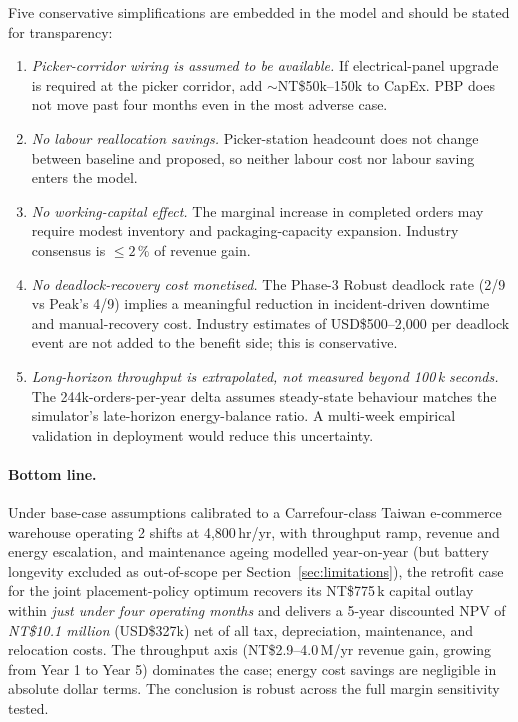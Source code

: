 \documentclass[conference]{IEEEtran}
\begin{document}
Five conservative simplifications are embedded in the model and should be stated for transparency:
\begin{enumerate}
  \item \emph{Picker-corridor wiring is assumed to be available.} If electrical-panel upgrade is required at the picker corridor, add $\sim$NT\$50k--150k to CapEx. PBP does not move past four months even in the most adverse case.
  \item \emph{No labour reallocation savings.} Picker-station headcount does not change between baseline and proposed, so neither labour cost nor labour saving enters the model.
  \item \emph{No working-capital effect.} The marginal increase in completed orders may require modest inventory and packaging-capacity expansion. Industry consensus is $\le 2\,\%$ of revenue gain.
  \item \emph{No deadlock-recovery cost monetised.} The Phase-3 Robust deadlock rate (2/9 vs Peak's 4/9) implies a meaningful reduction in incident-driven downtime and manual-recovery cost. Industry estimates of USD\$500--2{,}000 per deadlock event are not added to the benefit side; this is conservative.
  \item \emph{Long-horizon throughput is extrapolated, not measured beyond 100\,k seconds.} The 244k-orders-per-year delta assumes steady-state behaviour matches the simulator's late-horizon energy-balance ratio. A multi-week empirical validation in deployment would reduce this uncertainty.
\end{enumerate}

\paragraph{Bottom line.}
Under base-case assumptions calibrated to a Carrefour-class Taiwan e-commerce warehouse operating 2 shifts at 4{,}800\,hr/yr, with throughput ramp, revenue and energy escalation, and maintenance ageing modelled year-on-year (but battery longevity excluded as out-of-scope per Section~\ref{sec:limitations}), the retrofit case for the joint placement-policy optimum recovers its NT\$775\,k capital outlay within \emph{just under four operating months} and delivers a 5-year discounted NPV of \emph{NT\$10.1 million} (USD\$327k) net of all tax, depreciation, maintenance, and relocation costs. The throughput axis (NT\$2.9--4.0\,M/yr revenue gain, growing from Year 1 to Year 5) dominates the case; energy cost savings are negligible in absolute dollar terms. The conclusion is robust across the full margin sensitivity tested.
\end{document}
